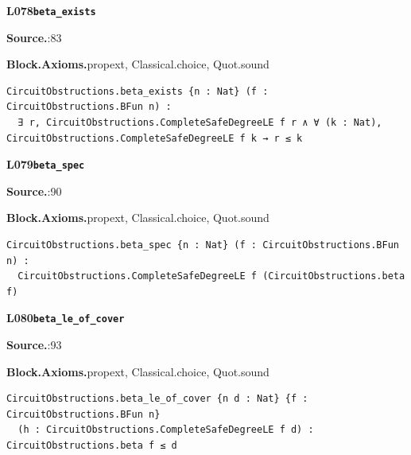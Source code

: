 \par\medskip\noindent\begin{minipage}{\textwidth}
{\small\bfseries L078\enspace\texttt{beta\_exists}\par}
{\footnotesize\raggedright\textbf{Source.}\enspace{}:83\par
\textbf{Block.}\quad\textbf{Axioms.}\enspace propext, Classical.choice, Quot.sound\par}\nopagebreak
\begin{lstlisting}
CircuitObstructions.beta_exists {n : Nat} (f : CircuitObstructions.BFun n) :
  ∃ r, CircuitObstructions.CompleteSafeDegreeLE f r ∧ ∀ (k : Nat), CircuitObstructions.CompleteSafeDegreeLE f k → r ≤ k
\end{lstlisting}
\end{minipage}\par

\par\medskip\noindent\begin{minipage}{\textwidth}
{\small\bfseries L079\enspace\texttt{beta\_spec}\par}
{\footnotesize\raggedright\textbf{Source.}\enspace{}:90\par
\textbf{Block.}\quad\textbf{Axioms.}\enspace propext, Classical.choice, Quot.sound\par}\nopagebreak
\begin{lstlisting}
CircuitObstructions.beta_spec {n : Nat} (f : CircuitObstructions.BFun n) :
  CircuitObstructions.CompleteSafeDegreeLE f (CircuitObstructions.beta f)
\end{lstlisting}
\end{minipage}\par

\par\medskip\noindent\begin{minipage}{\textwidth}
{\small\bfseries L080\enspace\texttt{beta\_le\_of\_cover}\par}
{\footnotesize\raggedright\textbf{Source.}\enspace{}:93\par
\textbf{Block.}\quad\textbf{Axioms.}\enspace propext, Classical.choice, Quot.sound\par}\nopagebreak
\begin{lstlisting}
CircuitObstructions.beta_le_of_cover {n d : Nat} {f : CircuitObstructions.BFun n}
  (h : CircuitObstructions.CompleteSafeDegreeLE f d) : CircuitObstructions.beta f ≤ d
\end{lstlisting}
\end{minipage}\par

